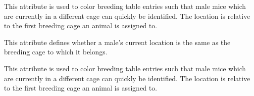 \documentclass[letterpaper,10pt,english]{sphinxmanual}
\begin{document}
\begin{fulllineitems}
\begin{fulllineitems}
This attribute is used to color breeding table entries such that male mice which are currently in a different cage can quickly be identified.
The location is relative to the first breeding cage an animal is assigned to.

\end{fulllineitems}



\begin{fulllineitems}
\label{api:mousedb.animal.models.Animal.breeding_females}
\end{fulllineitems}



\begin{fulllineitems}
\label{api:mousedb.animal.models.Animal.breeding_male_location_type}
This attribute defines whether a male's current location is the same as the breeding cage to which it belongs.

This attribute is used to color breeding table entries such that male mice which are currently in a different cage can quickly be identified.
The location is relative to the first breeding cage an animal is assigned to.

\end{fulllineitems}



\begin{fulllineitems}
\label{api:mousedb.animal.models.Animal.breeding_males}
\end{fulllineitems}



\begin{fulllineitems}
\label{api:mousedb.animal.models.Animal.father}
\end{fulllineitems}



\begin{fulllineitems}
\label{api:mousedb.animal.models.Animal.get_Background_display}
\end{fulllineitems}



\end{fulllineitems}
\end{document}
